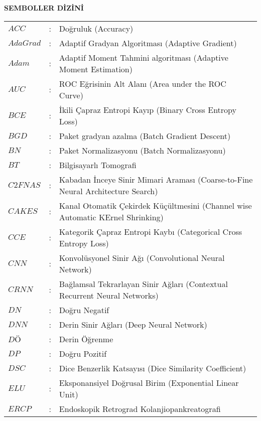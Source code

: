 \newpage
\pagestyle{plain}
\null\vspace{-1.5cm}%
\begin{center}
{\bf SEMBOLLER D\.{I}Z\.{I}N\.{I}}
\end{center}
\vspace{0.5cm}

\begin{longtable}{p{3.5cm}p{0.2cm}p{9.5cm}}
    $ACC $ & : &  Doğruluk (Accuracy) \\
    $AdaGrad $ & : &  Adaptif Gradyan Algoritması (Adaptive Gradient) \\
    $Adam $ & : &  Adaptif Moment Tahmini algoritması (Adaptive Moment Estimation) \\
    $AUC $ & : &  ROC Eğrisinin Alt Alanı (Area under the ROC Curve) \\
    $BCE $ & : &  İkili Çapraz Entropi Kayıp (Binary Cross Entropy Loss) \\
    $BGD $ & : &  Paket gradyan azalma (Batch Gradient Descent) \\
    $BN $ & : &  Paket Normalizasyonu (Batch Normalizasyonu) \\
    $BT $ & : &  Bilgisayarlı Tomografi \\
    $C2FNAS $ & : &  Kabadan İnceye Sinir Mimari Araması (Coarse-to-Fine Neural Architecture Search) \\
    $CAKES $ & : &  Kanal Otomatik Çekirdek Küçültmesini (Channel wise Automatic KErnel Shrinking) \\
    $CCE $ & : &  Kategorik Çapraz Entropi Kaybı (Categorical Cross Entropy Loss) \\
    $CNN $ & : &  Konvolüsyonel Sinir Ağı (Convolutional Neural Network) \\
    $CRNN $ & : &  Bağlamsal Tekrarlayan Sinir Ağları (Contextual Recurrent Neural Networks) \\
    $DN $ & : &  Doğru Negatif \\
    $DNN $ & : &  Derin Sinir Ağları (Deep Neural Network) \\
    $DÖ $ & : &  Derin Öğrenme \\
    $DP $ & : &  Doğru Pozitif \\
    $DSC $ & : &  Dice Benzerlik Katsayısı (Dice Similarity Coefficient) \\
    $ELU $ & : &  Eksponansiyel Doğrusal Birim (Exponential Linear Unit) \\
    $ERCP $ & : &  Endoskopik Retrograd Kolanjiopankreatografi \\

\end{longtable}
